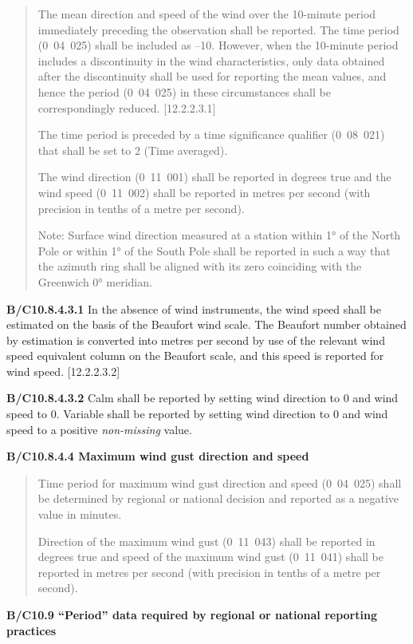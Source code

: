 \begin{quote}
The mean direction and speed of the wind over the 10-minute period immediately preceding the observation shall be reported. The time period (0~04~025) shall be included as --10. However, when the 10-minute period includes a discontinuity in the wind characteristics, only data obtained after the discontinuity shall be used for reporting the mean values, and hence the period (0~04~025) in these circumstances shall be correspondingly reduced. {[}12.2.2.3.1{]}

The time period is preceded by a time significance qualifier (0~08~021) that shall be set to 2 (Time averaged).

The wind direction (0~11~001) shall be reported in degrees true and the wind speed (0~11~002) shall be reported in metres per second (with precision in tenths of a metre per second).

Note: Surface wind direction measured at a station within 1° of the North Pole or within 1° of the South Pole shall be reported in such a way that the azimuth ring shall be aligned with its zero coinciding with the Greenwich 0° meridian.
\end{quote}

\textbf{B/C10.8.4.3.1} In the absence of wind instruments, the wind speed shall be estimated on the basis of the Beaufort wind scale. The Beaufort number obtained by estimation is converted into metres per second by use of the relevant wind speed equivalent column on the Beaufort scale, and this speed is reported for wind speed. {[}12.2.2.3.2{]}

\textbf{B/C10.8.4.3.2} Calm shall be reported by setting wind direction to 0 and wind speed to 0. Variable shall be reported by setting wind direction to 0 and wind speed to a positive \emph{non-missing} value.

\textbf{B/C10.8.4.4 Maximum wind gust direction and speed}

\begin{quote}
Time period for maximum wind gust direction and speed (0~04~025) shall be determined by regional or national decision and reported as a negative value in minutes.

Direction of the maximum wind gust (0~11~043) shall be reported in degrees true and speed of the maximum wind gust (0~11~041) shall be reported in metres per second (with precision in tenths of a metre per second).
\end{quote}

\textbf{B/C10.9 ``Period'' data required by regional or national reporting practices}

